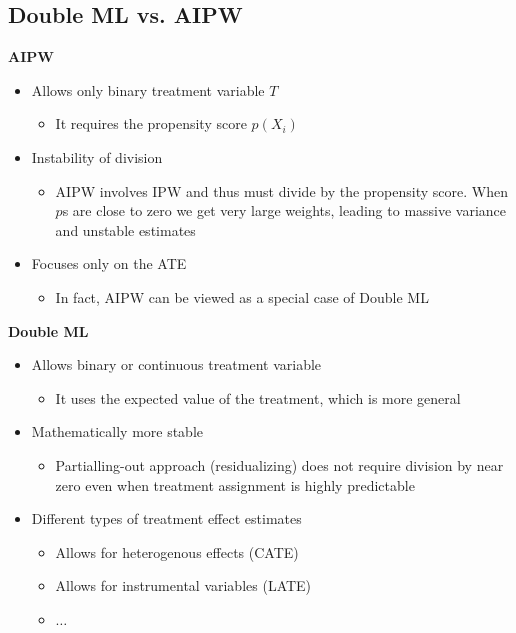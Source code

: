 \documentclass[10pt]{article}
\begin{document}
\subsection{Double ML vs. AIPW}
\textbf{AIPW}
\begin{itemize}
    \item Allows only binary treatment variable $T $
    \begin{itemize}
        \item It requires the propensity score $p(X_i) $
    \end{itemize}
    \item Instability of division
    \begin{itemize}
        \item AIPW involves IPW and thus must divide by the propensity score. When $p $s are close to zero we get very large weights, leading to massive variance and unstable estimates 
    \end{itemize}
    \item Focuses only on the ATE 
    \begin{itemize}
        \item In fact, AIPW can be viewed as a special case of Double ML 
    \end{itemize}
\end{itemize}
\textbf{Double ML}
\begin{itemize}
    \item Allows binary or continuous treatment variable 
    \begin{itemize}
        \item It uses the expected value of the treatment, which is more general
    \end{itemize}
    \item Mathematically more stable 
    \begin{itemize}
        \item Partialling-out approach (residualizing) does not require division by near zero even when treatment assignment is highly predictable 
    \end{itemize}
    \item Different types of treatment effect estimates 
    \begin{itemize}
        \item Allows for heterogenous effects (CATE)
        \item Allows for instrumental variables (LATE)
        \item $\dots$
    \end{itemize}
\end{itemize}
\end{document}
